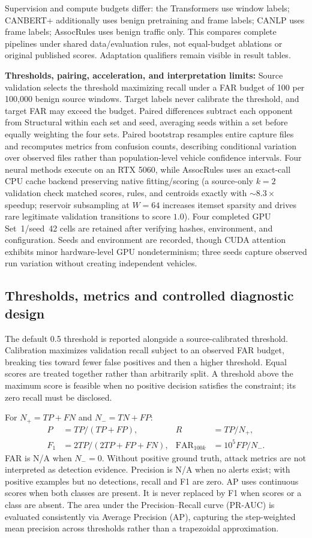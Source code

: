 \documentclass[12pt, a4paper, reqno, oneside]{book}
\begin{document}
Supervision and compute budgets differ: the Transformers use window labels; CANBERT+ additionally uses benign pretraining and frame labels; CANLP uses frame labels; AssocRules uses benign traffic only. This compares complete pipelines under shared data/evaluation rules, not equal-budget ablations or original published scores. Adaptation qualifiers remain visible in result tables.

\noindent\textbf{Thresholds, pairing, acceleration, and interpretation limits:} Source validation selects the threshold maximizing recall under a FAR budget of 100 per 100,000 benign source windows. Target labels never calibrate the threshold, and target FAR may exceed the budget. Paired differences subtract each opponent from Structural within each set and seed, averaging seeds within a set before equally weighting the four sets. Paired bootstrap resamples entire capture files and recomputes metrics from confusion counts, describing conditional variation over observed files rather than population-level vehicle confidence intervals. Four neural methods execute on an RTX 5060, while AssocRules uses an exact-call CPU cache backend preserving native fitting/scoring (a source-only $k=2$ validation check matched scores, rules, and centroids exactly with $\sim 8.3\times$ speedup; reservoir subsampling at $W=64$ increases itemset sparsity and drives rare legitimate validation transitions to score $1.0$). Four completed GPU Set~1/seed~42 cells are retained after verifying hashes, environment, and configuration. Seeds and environment are recorded, though CUDA attention exhibits minor hardware-level GPU nondeterminism; three seeds capture observed run variation without creating independent vehicles.

\subsection{Thresholds, metrics and controlled diagnostic design}
The default 0.5 threshold is reported alongside a source-calibrated threshold. Calibration maximizes validation recall subject to an observed FAR budget, breaking ties toward fewer false positives and then a higher threshold. Equal scores are treated together rather than arbitrarily split. A threshold above the maximum score is feasible when no positive decision satisfies the constraint; its zero recall must be disclosed.

For $N_+=TP+FN$ and $N_-=TN+FP$:
\begin{align}
P&=TP/(TP+FP), & R&=TP/N_+,\\
F_1&=2TP/(2TP+FP+FN), & \operatorname{FAR}_{100k}&=10^5FP/N_-.
\end{align}
FAR is N/A when $N_-=0$. Without positive ground truth, attack metrics are not interpreted as detection evidence. Precision is N/A when no alerts exist; with positive examples but no detections, recall and F1 are zero. AP uses continuous scores when both classes are present. It is never replaced by F1 when scores or a class are absent. The area under the Precision--Recall curve (PR-AUC) is evaluated consistently via Average Precision (AP), capturing the step-weighted mean precision across thresholds rather than a trapezoidal approximation.
\end{document}
